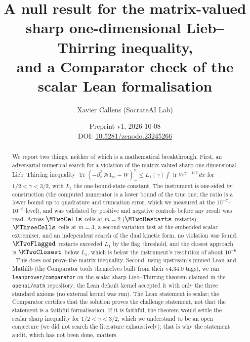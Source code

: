 \documentclass[11pt]{article}
\title{A null result for the matrix-valued sharp one-dimensional Lieb--Thirring inequality,\\
and a Comparator check of the scalar Lean formalisation}
\author{Xavier Callens (SocrateAI Lab)}
\date{Preprint v1, 2026-10-08\\ DOI: \href{https://doi.org/10.5281/zenodo.23245266}{10.5281/zenodo.23245266}}
\theoremstyle{remark}
\newcommand{\Lone}{L_1}
\begin{document}
\maketitle

\begin{abstract}
We report two things, neither of which is a mathematical breakthrough. First, an adversarial numerical search for
a violation of the matrix-valued sharp one-dimensional Lieb--Thirring inequality $\operatorname{Tr}(-\partial_x^2\otimes 1_m-W)_-^{\gamma}\le \Lone(\gamma)\int\operatorname{tr}W^{\gamma+1/2}\,dx$
for $1/2<\gamma<3/2$, with $\Lone$ the one-bound-state constant. The instrument is one-sided by construction (the computed numerator is a lower bound of the true one; the ratio is a lower bound up to
quadrature and truncation error, which we measured at the $10^{-7}$--$10^{-6}$ level), and was validated by positive and negative controls before any result was read.
Across $\MTwoCells$ cells at $m=2$ ($\MTwoRestarts$ restarts), $\MThreeCells$ cells at $m=3$, a second-variation test at the embedded scalar extremiser,
and an independent search of the dual kinetic form, no violation was found: $\MTwoFlagged$ restarts exceeded $\Lone$ by the flag threshold, and the closest approach is
$\MTwoClosest$ below $\Lone$, which is below the instrument's resolution of about $10^{-6}$. This does \emph{not} prove the matrix inequality.
Second, using upstream's pinned Lean and Mathlib (the Comparator tools themselves built from their v4.34.0 tags), we ran \texttt{leanprover/comparator} on the scalar sharp Lieb--Thirring theorem claimed in the
\texttt{openai/math} repository; the Lean default kernel accepted it with only the three standard axioms (no external kernel was run). The Lean statement is scalar; the Comparator
certifies that the solution proves the challenge statement, not that the statement is a faithful formalisation. If it is faithful, the theorem would settle the scalar sharp inequality for $1/2<\gamma<3/2$,
which we understand to be an open conjecture (we did not search the literature exhaustively); that is why the statement audit, which has not been done, matters.
\end{abstract}
\end{document}
